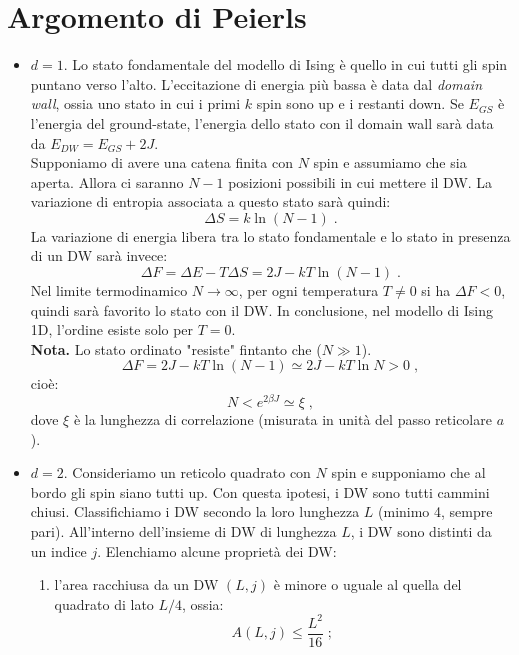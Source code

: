 \documentclass[10pt,a4paper]{report}
\theoremstyle{definition}
\numberwithin{equation}{section}
\begin{document}
\section{Argomento di Peierls}
\begin{itemize}
\item $d=1$. Lo stato fondamentale del modello di Ising è quello in cui tutti gli spin puntano verso l'alto. L'eccitazione di energia più bassa è data dal \emph{domain wall}, ossia uno stato in cui i primi $k$ spin sono up e i restanti down. Se $E_{GS}$ è l'energia del ground-state, l'energia dello stato con il domain wall sarà data da $E_{DW}=E_{GS}+2J$. \\
Supponiamo di avere una catena finita con $N$ spin e assumiamo che sia aperta. Allora ci saranno $N-1$ posizioni possibili in cui mettere il DW. La variazione di entropia associata a questo stato sarà quindi:
\begin{equation}
\Delta S=k\ln(N-1)\;.
\end{equation}
La variazione di energia libera tra lo stato fondamentale e lo stato in presenza di un DW sarà invece:
\begin{equation}
\Delta F=\Delta E-T\Delta S=2J-kT\ln(N-1)\;.
\end{equation}
Nel limite termodinamico $N\to\infty$, per ogni temperatura $T\ne 0$ si ha $\Delta F<0$, quindi sarà favorito lo stato con il DW. In conclusione, nel modello di Ising 1D, l'ordine esiste solo per $T=0$. \\
\textbf{Nota.} Lo stato ordinato "resiste" fintanto che ($N\gg 1$).
$$
\Delta F=2J-kT\ln(N-1)\simeq 2J-kT\ln N>0\;,
$$
cioè:
\begin{equation}
N<e^{2\beta J}\simeq \xi\;,
\end{equation}
dove $\xi$ è la lunghezza di correlazione (misurata in unità del passo reticolare $a$).
\item $d=2$. Consideriamo un reticolo quadrato con $N$ spin e supponiamo che al bordo gli spin siano tutti up. Con questa ipotesi, i DW sono tutti cammini chiusi. Classifichiamo i DW secondo la loro lunghezza $L$ (minimo 4, sempre pari). All'interno dell'insieme di DW di lunghezza $L$, i DW sono distinti da un indice $j$. Elenchiamo alcune proprietà dei DW:
\begin{enumerate}
\item l'area racchiusa da un DW $(L,j)$ è minore o uguale al quella del quadrato di lato $L/4$, ossia:
\begin{equation}
A(L,j)\le \frac{L^2}{16}\;;
\end{equation}

\end{enumerate}
\end{itemize}
\end{document}
